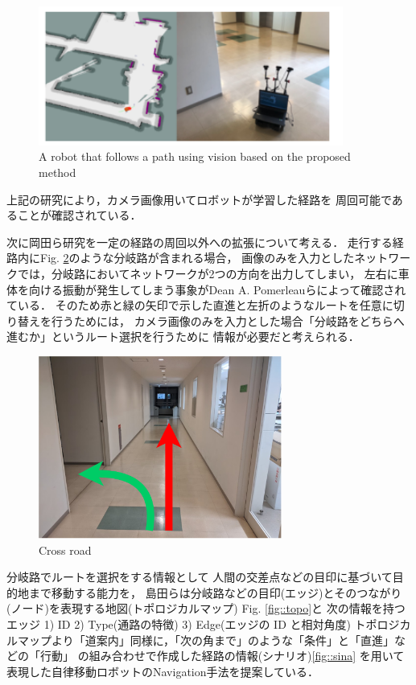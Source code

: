 \begin{figure}[h]
    \centering
    \includegraphics[width = 10cm]{./figs/okada.png}
    \caption{A robot that follows a path using vision based on the proposed method\cite{okada}}
    \label{fig::okada}
\end{figure}

\newpage
上記の研究により，カメラ画像用いてロボットが学習した経路を
周回可能であることが確認されている．


次に岡田ら\cite{okada}研究を一定の経路の周回以外への拡張について考える．
走行する経路内にFig. \ref{fig::bunki}のような分岐路が含まれる場合，
画像のみを入力としたネットワークでは，分岐路においてネットワークが2つの方向を出力してしまい，
左右に車体を向ける振動が発生してしまう事象がDean A. Pomerleauら\cite{pomeru}によって確認されている．
そのため赤と緑の矢印で示した直進と左折のようなルートを任意に切り替えを行うためには，
カメラ画像のみを入力とした場合「分岐路をどちらへ進むか」というルート選択を行うために
情報が必要だと考えられる．
 \vspace{4.0zh}
\begin{figure}[h]
    \centering
    \includegraphics[width = 8cm]{./figs/bunki.pdf}
    \caption{Cross road}
    \label{fig::bunki}
\end{figure}
\newpage

分岐路でルートを選択をする情報として
人間の交差点などの目印に基づいて目的地まで移動する能力を，
島田らは分岐路などの目印(エッジ)とそのつながり(ノード)を表現する地図(トポロジカルマップ)
Fig. \ref{fig::topo}と
次の情報を持つエッジ
1) ID
2) Type(通路の特徴)
3) Edge(エッジの ID と相対角度)
トポロジカルマップより「道案内」同様に，「次の角まで」のような「条件」と「直進」などの「行動」
の組み合わせで作成した経路の情報(シナリオ)\ref{fig::sina}
を用いて表現した自律移動ロボットのNavigation手法を提案している．

